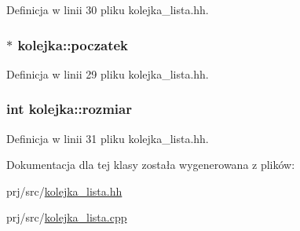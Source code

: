 \-Definicja w linii 30 pliku kolejka\-\_\-lista.\-hh.

\hypertarget{classkolejka_a71d1822dbeb8c1b76339c2429f0527c2}{
\subsubsection[{poczatek}]{$\ast$ {\bf kolejka\-::poczatek}}}\label{classkolejka_a71d1822dbeb8c1b76339c2429f0527c2}


\-Definicja w linii 29 pliku kolejka\-\_\-lista.\-hh.

\hypertarget{classkolejka_a0fe33a7248ca72a87c55ab9e56c0e172}{
\subsubsection[{rozmiar}]{\setlength{\rightskip}{0pt plus 5cm}int {\bf kolejka\-::rozmiar}}}\label{classkolejka_a0fe33a7248ca72a87c55ab9e56c0e172}


\-Definicja w linii 31 pliku kolejka\-\_\-lista.\-hh.



\-Dokumentacja dla tej klasy została wygenerowana z plików\-:\begin{DoxyCompactItemize}
\item 
prj/src/\hyperlink{kolejka__lista_8hh}{kolejka\-\_\-lista.\-hh}\item 
prj/src/\hyperlink{kolejka__lista_8cpp}{kolejka\-\_\-lista.\-cpp}\end{DoxyCompactItemize}

